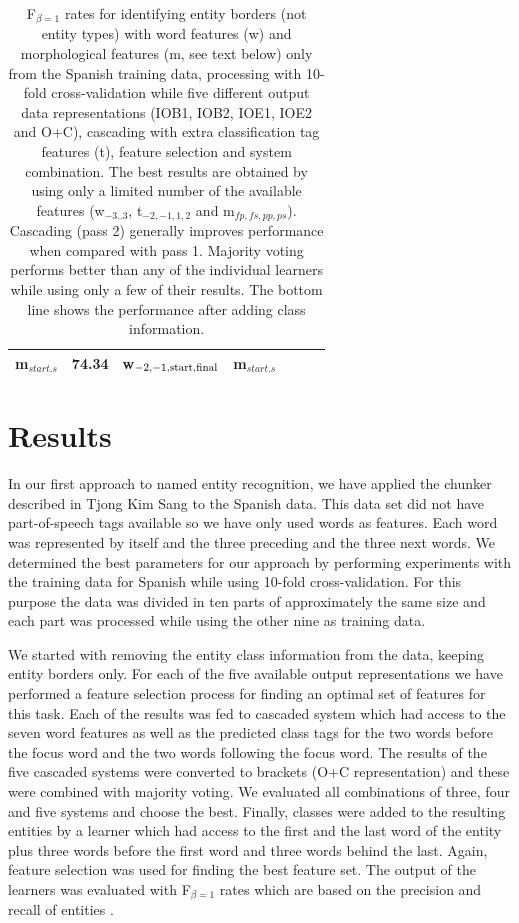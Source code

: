 \documentclass[11pt]{article}
\begin{document}
\begin{table}[t]
\begin{center}
\begin{tabular}{|l|c|ll|c|lll|}
                          m$_{start.s}$
                & 74.34 & \multicolumn{2}{l}{w$_{{\rm -2,-1,start,final}}$}
                        & m$_{start.s}$\\\hline
\end{tabular}
\label{tab-wordsandmorph}
\caption{
F$_{\beta=1}$ rates for identifying entity borders (not entity types)
with word features (w) and morphological features (m, see text below)
only from the Spanish training data, processing with 10-fold
cross-validation while five different output data representations
(IOB1, IOB2, IOE1, IOE2 and O+C), cascading with extra classification
tag features (t), feature selection and system combination.
The best results are obtained by using only a limited number of the
available features (w$_{-3..3}$, t$_{-2,-1,1,2}$ and
m$_{fp,fs,pp,ps}$).
Cascading (pass 2) generally improves performance when compared
with pass 1.
Majority voting performs better than any of the individual learners
while using only a few of their results.
The bottom line shows the performance after adding class information.
}
\end{center}
\end{table}

\section{Results}

In our first approach to named entity recognition, we have applied
the chunker described in Tjong Kim Sang  to the
Spanish data.
This data set did not have part-of-speech tags available so we have
only used words as features.
Each word was represented by itself and the three preceding and the
three next words.
We determined the best parameters for our approach by performing
experiments with the training data for Spanish while using 10-fold
cross-validation.
For this purpose the data was divided in ten parts of approximately
the same size and each part was processed while using the other nine
as training data.

We started with removing the entity class information from the data,
keeping entity borders only.
For each of the five available output representations we have
performed a feature selection process for finding an optimal set
of features for this task.
Each of the results was fed to cascaded system which had access to the
seven word features as well as the predicted class tags for the two
words before the focus word and the two words following the focus
word.
The results of the five cascaded systems were converted to brackets
(O+C representation) and these were combined with majority voting.
We evaluated all combinations of three, four and five systems and
choose the best.
Finally, classes were added to the resulting entities by a learner
which had access to the first and the last word of the entity plus
three words before the first word and three words behind the last.
Again, feature selection was used for finding the best feature set.
The output of the learners was evaluated with F$_{\beta=1}$ rates
which are based on the precision and recall of entities
\cite{vanrijsbergen75}.
\end{document}
